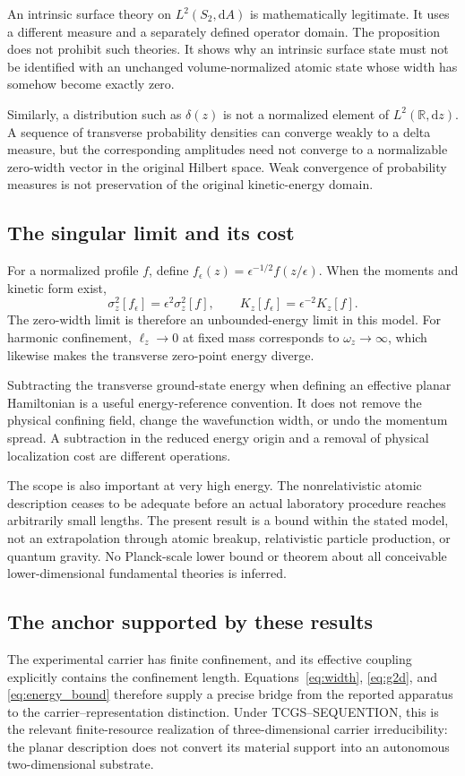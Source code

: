 \documentclass[11pt,a4paper]{article}
\theoremstyle{definition}
\theoremstyle{remark}
\newcommand{\TCGS}{TCGS--SEQUENTION}
\newcommand{\dd}{\mathrm{d}}
\newcommand{\R}{\mathbb{R}}
\newcommand{\lop}{\ell_z}
\begin{document}
An intrinsic surface theory on $L^2(S_2,\dd A)$ is mathematically legitimate. It uses a different measure and a separately defined operator domain. The proposition does not prohibit such theories. It shows why an intrinsic surface state must not be identified with an unchanged volume-normalized atomic state whose width has somehow become exactly zero.

Similarly, a distribution such as $\delta(z)$ is not a normalized element of $L^2(\R,\dd z)$. A sequence of transverse probability densities can converge weakly to a delta measure, but the corresponding amplitudes need not converge to a normalizable zero-width vector in the original Hilbert space. Weak convergence of probability measures is not preservation of the original kinetic-energy domain.

\subsection{The singular limit and its cost}
For a normalized profile $f$, define $f_\epsilon(z)=\epsilon^{-1/2}f(z/\epsilon)$. When the moments and kinetic form exist,
\begin{equation}
 \sigma_z^2[f_\epsilon]=\epsilon^2\sigma_z^2[f],
 \qquad K_z[f_\epsilon]=\epsilon^{-2}K_z[f].
 \label{eq:scaling_width}
\end{equation}
The zero-width limit is therefore an unbounded-energy limit in this model. For harmonic confinement, $\lop\to0$ at fixed mass corresponds to $\omega_z\to\infty$, which likewise makes the transverse zero-point energy diverge.

Subtracting the transverse ground-state energy when defining an effective planar Hamiltonian is a useful energy-reference convention. It does not remove the physical confining field, change the wavefunction width, or undo the momentum spread. A subtraction in the reduced energy origin and a removal of physical localization cost are different operations.

The scope is also important at very high energy. The nonrelativistic atomic description ceases to be adequate before an actual laboratory procedure reaches arbitrarily small lengths. The present result is a bound within the stated model, not an extrapolation through atomic breakup, relativistic particle production, or quantum gravity. No Planck-scale lower bound or theorem about all conceivable lower-dimensional fundamental theories is inferred.\cite{planck}

\subsection{The anchor supported by these results}
The experimental carrier has finite confinement, and its effective coupling explicitly contains the confinement length. Equations~\eqref{eq:width}, \eqref{eq:g2d}, and \eqref{eq:energy_bound} therefore supply a precise bridge from the reported apparatus to the carrier--representation distinction. Under \TCGS, this is the relevant finite-resource realization of three-dimensional carrier irreducibility: the planar description does not convert its material support into an autonomous two-dimensional substrate.\cite{zhang2026,foundation}
\end{document}
